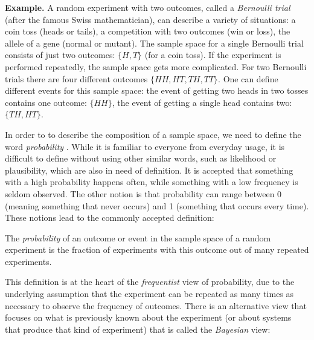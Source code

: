 \documentclass[
  letterpaper,
  DIV=11,
  numbers=noendperiod]{scrreprt}
\begin{document}
\textbf{Example.} A random experiment with two outcomes, called a
\emph{Bernoulli trial} (after the famous Swiss mathematician), can
describe a variety of situations: a coin toss (heads or tails), a
competition with two outcomes (win or loss), the allele of a gene
(normal or mutant). The sample space for a single Bernoulli trial
consists of just two outcomes: \(\{H,T\}\) (for a coin toss). If the
experiment is performed repeatedly, the sample space gets more
complicated. For two Bernoulli trials there are four different outcomes
\(\{HH, HT, TH, TT \}\). One can define different events for this sample
space: the event of getting two heads in two tosses contains one
outcome: \(\{HH\}\), the event of getting a single head contains two:
\(\{TH, HT\}\).

In order to to describe the composition of a sample space, we need to
define the word \emph{probability} \cite{feller_introduction_????}.
While it is familiar to everyone from everyday usage, it is difficult to
define without using other similar words, such as likelihood or
plausibility, which are also in need of definition. It is accepted that
something with a high probability happens often, while something with a
low frequency is seldom observed. The other notion is that probability
can range between 0 (meaning something that never occurs) and 1
(something that occurs every time). These notions lead to the commonly
accepted definition:

\begin{tcolorbox}[enhanced jigsaw, arc=.35mm, colframe=quarto-callout-note-color-frame, left=2mm, opacitybacktitle=0.6, breakable, title=\textcolor{quarto-callout-note-color}{\faInfo}\hspace{0.5em}{Definition}, toprule=.15mm, coltitle=black, bottomtitle=1mm, toptitle=1mm, colback=white, leftrule=.75mm, colbacktitle=quarto-callout-note-color!10!white, titlerule=0mm, opacityback=0, rightrule=.15mm, bottomrule=.15mm]

The \emph{probability} of an outcome or event in the sample space of a
random experiment is the fraction of experiments with this outcome out
of many repeated experiments.

\end{tcolorbox}

This definition is at the heart of the \emph{frequentist} view of
probability, due to the underlying assumption that the experiment can be
repeated as many times as necessary to observe the frequency of
outcomes. There is an alternative view that focuses on what is
previously known about the experiment (or about systems that produce
that kind of experiment) that is called the \emph{Bayesian} view:
\end{document}
